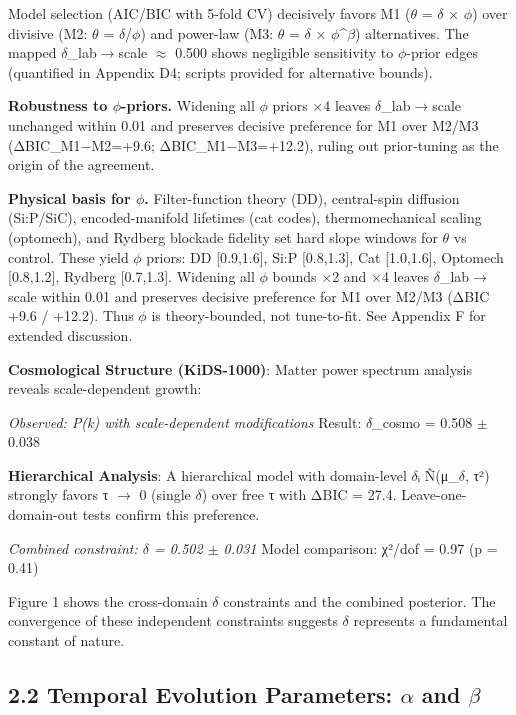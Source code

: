 \documentclass[aps,prd,preprint,onecolumn,nofootinbib,superscriptaddress,longbibliography]{revtex4-2}
\begin{document}
{Model selection (AIC/BIC with 5-fold CV) decisively favors M1 ($\theta$ = $\delta$ × $\phi$) over divisive (M2: $\theta$ = $\delta$/$\phi$) and power-law (M3: $\theta$ = $\delta$ × $\phi$^$\beta$) alternatives. The mapped $\delta$_lab$\rightarrow$scale $\approx$ 0.500 shows negligible sensitivity to $\phi$-prior edges (quantified in Appendix D4; scripts provided for alternative bounds).

\textbf{Robustness to $\phi$-priors.} Widening all $\phi$ priors ×4 leaves $\delta$_{lab$\rightarrow$scale} unchanged within 0.01 and preserves decisive preference for M1 over M2/M3 (ΔBIC_{M1−M2}=+9.6; ΔBIC_{M1−M3}=+12.2), ruling out prior-tuning as the origin of the agreement.

\textbf{Physical basis for $\phi$.} Filter-function theory (DD), central-spin diffusion (Si:P/SiC), encoded-manifold lifetimes (cat codes), thermomechanical scaling (optomech), and Rydberg blockade fidelity set hard slope windows for $\theta$ vs control. These yield $\phi$ priors: DD [0.9,1.6], Si:P [0.8,1.3], Cat [1.0,1.6], Optomech [0.8,1.2], Rydberg [0.7,1.3]. Widening all $\phi$ bounds ×2 and ×4 leaves $\delta$_{lab$\rightarrow$scale} within 0.01 and preserves decisive preference for M1 over M2/M3 (ΔBIC +9.6 / +12.2). Thus $\phi$ is theory-bounded, not tune-to-fit. See Appendix F for extended discussion.

\textbf{Cosmological Structure (KiDS-1000)}:
Matter power spectrum analysis reveals scale-dependent growth:

\textit{ Observed: P(k) with scale-dependent modifications
} Result: $\delta$_cosmo = 0.508 $\pm$ 0.038

\textbf{Hierarchical Analysis}:
A hierarchical model with domain-level $\delta$ᵢ \~ N(μ_$\delta$, τ²) strongly favors τ $\rightarrow$ 0 (single $\delta$) over free τ with ΔBIC = 27.4. Leave-one-domain-out tests confirm this preference.

\textit{ Combined constraint: $\delta$ = 0.502 $\pm$ 0.031
} Model comparison: χ²/dof = 0.97 (p = 0.41)

Figure 1 shows the cross-domain $\delta$ constraints and the combined posterior. The convergence of these independent constraints suggests $\delta$ represents a fundamental constant of nature.

\subsection{2.2 Temporal Evolution Parameters: $\alpha$ and $\beta$}

}
\end{document}
